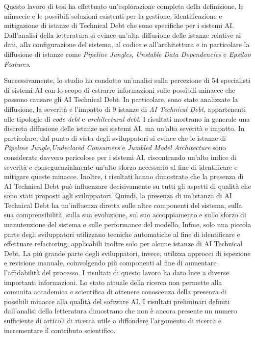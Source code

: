
Questo lavoro di tesi ha effettuato un'esplorazione completa della definizione, le minaccie e le possibili soluzioni esistenti per la gestione, identificazione e mitigazione di istanze di Technical Debt che sono specifiche per i sistemi AI.
Dall'analisi della letteratura si evince un'alta diffusione delle istanze relative ai dati, alla configurazione del sistema, al codice e all'architettura e in particolare la diffusione di istanze come \textit{Pipeline Jungles}, \textit{Unstable Data Dependencies} e \textit{Epsilon Features}.

Successivamente, lo studio ha condotto un'analisi sulla percezione di 54 specialisti di sistemi AI con lo scopo di estrarre informazioni sulle possibili minacce che possono causare gli AI Technical Debt. In particolare, sono state analizzate la diffusione, la severità e l'impatto di 9 istanze di \textit{AI Technical Debt}, appartenenti alle tipologie di \textit{code debt} e \textit{architectural debt}.
I risultati mostrano in generale una discreta diffusione delle istanze nei sistemi AI, ma un'alta severità e impatto. 
In particolare, dal punto di vista degli sviluppatori si evince che le istanze di \textit{Pipeline Jungle},\textit{Undeclared Consumers} e \textit{Jumbled Model Architecture} sono considerate davvero pericolose per i sistemi AI, riscontrando un'alto indice di severità e conseguenzialmente un'alto sforzo necessario al fine di identificare e mitigare queste minacce.
Inoltre, i risultati hanno dimostrato che la presenza di AI Technical Debt può influenzare decisivamente su tutti gli aspetti di qualità che sono stati proposti agli sviluppatori.
Quindi, la presenza di un'istanza di AI Technical Debt ha un'influenza diretta sulle altre componenti del sistema, sulla sua comprensibilità, sulla sua evoluzione, sul suo accoppiamento e sullo sforzo di manutenzione del sistema e sulle performance del modello,
Infine, solo una piccola parte degli sviluppatori utilizzano tecniche automatiche al fine di identificare e effettuare refactoring, applicabili inoltre solo per alcune istanze di AI Technical Debt.
La più grande parte degli sviluppatori, invece, utilizza approcci di ispezione e revisione manuale, coinvolgendo più componenti al fine di aumentare l'affidabilità del processo.
I risultati di questo lavoro ha dato luce a diverse importanti informazioni.
Lo stato attuale della ricerca non permette alla comunita accademica e scientifica di ottenere conoscenza della presenza di possibili minacce alla qualità del software AI. 
I risultati preliminari definiti dall'analisi della letteratura dimostrano che non è ancora presente un numero sufficiente di articoli di ricerca utile a diffondere l'argomento di ricerca e incrementare il contributo scientifico.
